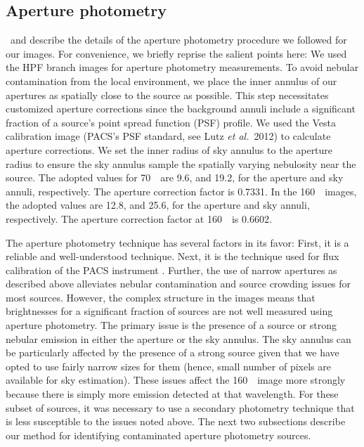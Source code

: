 \documentclass[manuscript]{aastex}
\newcommand{\etal}{{\em et al.}}
\begin{document}
\subsection{Aperture photometry}
\par
\cite{pbrpaper}\ and \cite{furlan} describe the details of the aperture photometry procedure we followed for our images.  For convenience, we briefly reprise the salient points here:  We used the HPF branch images for aperture photometry measurements.  To avoid nebular contamination from the local environment, we place the inner annulus of our apertures as spatially close to the source as possible.  This step necessitates customized aperture corrections since the background annuli include a significant fraction of a source's point spread function (PSF) profile.  We used the Vesta calibration image (PACS's PSF standard, see Lutz \etal\ 2012) to calculate aperture corrections.  We set the inner radius of sky annulus to the aperture radius to ensure the
sky annulus sample the spatially varying nebulosity near the source.  The adopted values for 70~\micron\ are 9.6\arcsec, and 19.2\arcsec, for the aperture and sky annuli, respectively. The aperture correction factor is 0.7331.  In the 160~\micron\ images, the adopted values are 12.8\arcsec, and 25.6\arcsec, for the aperture and sky annuli, respectively.  The aperture correction factor at 160~\micron\ is 0.6602.
\par
The aperture photometry technique has several factors in its favor: First, it is a reliable and well-understood technique.  Next, it is the technique used for flux calibration of the PACS instrument \citep{pacscal}.  Further, the use of narrow apertures as described above alleviates nebular contamination and source crowding issues for most sources.  However, the complex structure in the images means that brightnesses for a significant fraction of sources are not well measured using aperture photometry.  The primary issue is the presence of a source or strong nebular emission in either the aperture or the sky annulus.  The sky annulus can be particularly affected by the presence of a strong source given that we have opted to use fairly narrow sizes for them (hence, small number of pixels are available for sky estimation).   These issues affect the 160~\micron\ image more strongly because there is simply more emission detected at that wavelength.  For these subset of sources, it was necessary to use a secondary photometry technique that is less susceptible to the issues noted above.  The next two subsections describe our method for identifying contaminated aperture photometry sources.
\end{document}
